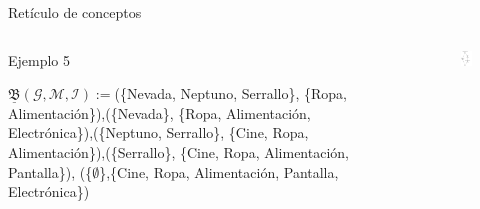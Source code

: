 \documentclass{beamer}
\newcommand{\M}{\mathcal{M}}
\newcommand{\I}{\mathcal{I}}
\newcommand{\G}{\mathcal{G}}
\begin{document}
\begin{frame}{Retículo de conceptos}

    \begin{columns}
    \begin{column}{0.75\textwidth}
    \begin{block}{Ejemplo 5}
    \begin{small}
      $\underline{\mathfrak{B}}(\G,\M,\I):=$\textbraceleft\linebreak(\{Nevada, Neptuno, Serrallo\}, \{Ropa, Alimentación\}),\linebreak (\{Nevada\}, \{Ropa, Alimentación, Electrónica\}),\linebreak \alert<3>{(\{Neptuno, Serrallo\}, \{Cine, Ropa, Alimentación\})},\linebreak (\{Serrallo\}, \{Cine, Ropa, Alimentación, Pantalla\}),\linebreak
      (\{$\emptyset$\},\{Cine, Ropa, Alimentación, Pantalla, Electrónica\})\linebreak
      \textbraceright 
      \end{small}
    \end{block}
    \pause
    \end{column}
    \hspace{-6mm}
    \begin{column}{0.25\textwidth}
             \begin{figure}[H]
            \includegraphics[scale=0.38]{images/grafo-comerciales.png}
    \end{figure}
    \end{column}

   \end{columns}
  \end{frame}
\end{document}
